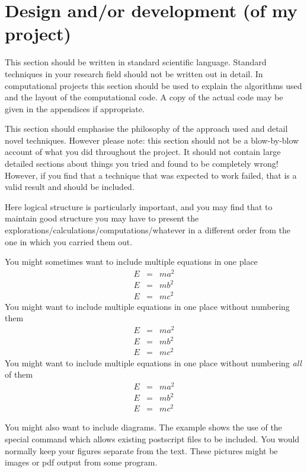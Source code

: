 \documentclass[12pt,a4paper]{report}
\begin{document}
\chapter{Design and/or development (of my project)}

This section should be written in standard scientific
language. Standard techniques in your research field should not be
written out in detail. In computational projects this section should
be used to explain the algorithms used and the layout of the
computational code. A copy of the actual code may be given in the
appendices if appropriate.

This section should emphasise the philosophy of the approach used and
detail novel techniques. However please note: this section should not
be a blow-by-blow account of what you did throughout the project. It
should not contain large detailed sections about things you tried and
found to be completely wrong! However, if you find that a technique
that was expected to work failed, that is a valid result and should be
included.

Here logical structure is particularly important, and you may find
that to maintain good structure you may have to present the
explorations/calculations/computations/whatever in a different order
from the one in which you carried them out.


You might sometimes want to include multiple equations in one place
\begin{eqnarray}
  E &=& ma^{2} \\
  E &=& mb^{2} \\
  E &=& mc^{2}
\end{eqnarray}
You might want to include multiple equations in one place without
numbering them
\begin{eqnarray*}
  E &=& ma^{2} \\
  E &=& mb^{2} \\
  E &=& mc^{2}
\end{eqnarray*}
You might want to include multiple equations in one place without
numbering \emph{all} of them
\begin{eqnarray}
  E &=& ma^{2} \nonumber \\
  E &=& mb^{2} \nonumber \\
  E &=& mc^{2}
\end{eqnarray}

You might also want to include diagrams.  The example shows the use of
the special command which allows existing postscript files to be
included.  You would normally keep your figures separate from the text. 
These pictures might be images or pdf output from some
program.
\end{document}
